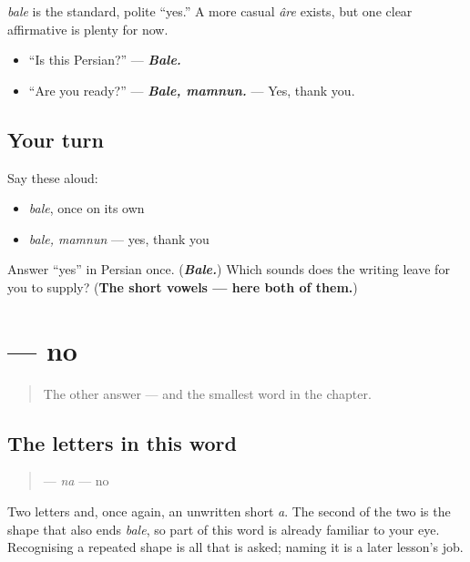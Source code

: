 \begin{culture}
\emph{bale} is the standard, polite “yes.” A more casual \emph{âre} exists, but one clear affirmative is plenty for now.

\begin{itemize}
\raggedright
  \item “Is this Persian?” — \emph{\textbf{Bale.}}
  \item “Are you ready?” — \emph{\textbf{Bale, mamnun.}} — Yes, thank you.
\end{itemize}
\end{culture}

\subsection*{Your turn}
Say these aloud:

\begin{itemize}
\raggedright
  \item \emph{bale}, once on its own
  \item \emph{bale, mamnun} — yes, thank you
\end{itemize}

\begin{tcolorbox}[breakable,colback=teal!4,colframe=teal!35!black,title={Before you move on}]
Answer “yes” in Persian once. (\emph{\textbf{Bale.}}) Which sounds does the writing leave for you to supply? (\textbf{The short vowels — here both of them.})
\end{tcolorbox}
\section[\texorpdfstring{\fa{نه} (na)}{نه (na)}]{ — no}

\label{lesson:FA-C01-na}



\begin{quote}
The other answer — and the smallest word in the chapter.
\end{quote}

\subsection*{The letters in this word}
\begin{quote}
\textbf{} — \emph{na} — no
\end{quote}

Two letters and, once again, an unwritten short \emph{a}. The second of the two is the shape that also ends \emph{bale}, so part of this word is already familiar to your eye. Recognising a repeated shape is all that is asked; naming it is a later lesson's job.

